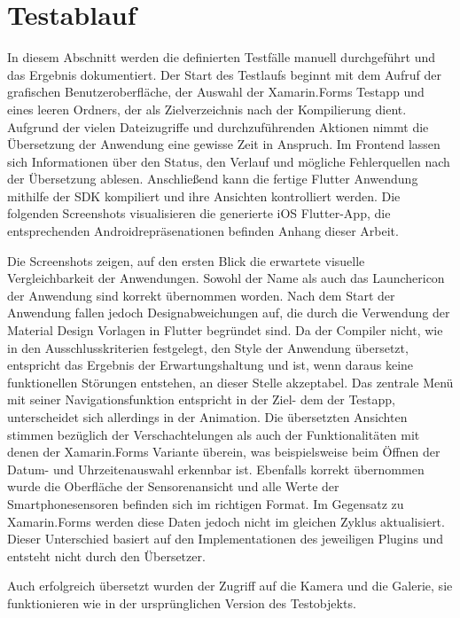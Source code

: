 \section{Testablauf}
In diesem Abschnitt werden die definierten Testfälle manuell durchgeführt und das Ergebnis dokumentiert. 
Der Start  des Testlaufs beginnt mit dem Aufruf der grafischen Benutzeroberfläche,   der Auswahl der Xamarin.Forms Testapp und eines leeren Ordners, der als Zielverzeichnis nach der Kompilierung dient. 
Aufgrund der vielen Dateizugriffe und durchzuführenden Aktionen nimmt die Übersetzung der Anwendung eine gewisse Zeit in Anspruch. Im Frontend lassen sich Informationen über den Status, den Verlauf und mögliche Fehlerquellen nach der Übersetzung ablesen.  Anschließend kann die fertige Flutter Anwendung mithilfe der SDK kompiliert und ihre Ansichten kontrolliert werden.  Die folgenden Screenshots visualisieren die generierte iOS Flutter-App,  die entsprechenden Androidrepräsenationen befinden Anhang dieser Arbeit.

Die Screenshots zeigen,  auf den ersten Blick die erwartete visuelle Vergleichbarkeit der Anwendungen.  Sowohl der Name als auch das Launchericon der Anwendung sind korrekt übernommen worden.  
Nach dem Start der Anwendung fallen jedoch Designabweichungen auf, die durch die Verwendung 
der Material Design Vorlagen in Flutter begründet sind.
Da der Compiler nicht,  wie in den Ausschlusskriterien festgelegt, den Style der Anwendung übersetzt, 
entspricht das Ergebnis der Erwartungshaltung und ist, wenn daraus keine funktionellen Störungen 
entstehen,  an dieser Stelle akzeptabel.
 Das zentrale Menü mit seiner Navigationsfunktion entspricht in der Ziel- dem der Testapp,  
unterscheidet sich allerdings in der Animation.
  Die übersetzten Ansichten stimmen  bezüglich der Verschachtelungen als auch der Funktionalitäten mit denen der Xamarin.Forms Variante überein, was beispielsweise beim Öffnen der Datum- und Uhrzeitenauswahl erkennbar ist.
Ebenfalls korrekt übernommen wurde die Oberfläche der Sensorenansicht und alle Werte der 
Smartphonesensoren befinden sich im richtigen Format.
 Im Gegensatz zu Xamarin.Forms werden diese Daten jedoch nicht im gleichen Zyklus aktualisiert.  Dieser Unterschied basiert auf den Implementationen des jeweiligen Plugins und entsteht nicht durch den Übersetzer.  
 
 
 Auch erfolgreich übersetzt wurden der Zugriff auf die Kamera und die Galerie,  sie funktionieren wie in der ursprünglichen Version des Testobjekts.
 
 
 
